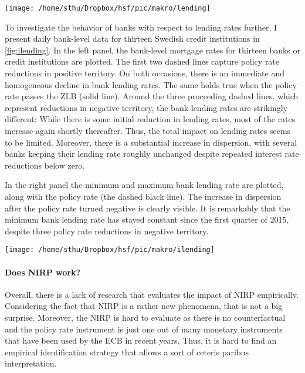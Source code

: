 \begin{center}
\texttt{[image: /home/sthu/Dropbox/hsf/pic/makro/lending]}
\label{fig:lending}
\end{center}

To investigate the behavior of banks with respect to lending rates further, I present daily bank-level data for thirteen Swedish credit institutions in \autoref{fig:ilending}.
In the left panel, the bank-level mortgage rates for thirteen banks or credit institutions are plotted. The first two dashed lines capture policy rate reductions in positive territory. On both occasions, there is an immediate and homogeneous decline in bank lending rates. The same holds true when the policy rate passes the ZLB (solid line). Around the three proceeding dashed lines, which represent reductions in negative territory, the bank lending rates are strikingly different: While there is some initial reduction in lending rates, most of the rates increase again shortly thereafter. Thus, the total impact on lending rates seems to be limited. Moreover, there is a substantial increase in dispersion, with several banks keeping their lending rate roughly unchanged despite repeated interest rate reductions below zero. 

In the right panel the minimum and maximum bank lending rate are plotted, along with the policy rate (the dashed black line). The increase in dispersion after the policy rate turned negative is clearly visible. It is remarkably that the minimum bank lending rate has stayed constant since the first quarter of 2015, despite three policy rate reductions in negative territory.



\begin{center}
\texttt{[image: /home/sthu/Dropbox/hsf/pic/makro/ilending]}
\label{fig:ilending}
\end{center}


\paragraph{Does NIRP work?}
Overall, there is a lack of research that evaluates the impact of NIRP empirically. Considering the fact that NIRP is a rather new phenomena, that is not a big surprise. Moreover, the NIRP is hard to evaluate as there is no counterfactual and the policy rate instrument is just one out of many monetary instruments that have been used by the ECB in recent years. Thus, it is hard to find an empirical identification strategy that allows a sort of ceteris paribus interpretation.

